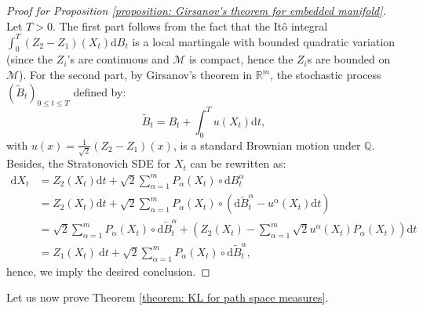\documentclass[10pt,a4paper]{article}
\newcommand{\R}{{\mathbb R}}
\begin{document}
	\begin{proof}[Proof for Proposition \ref{proposition: Girsanov's theorem for embedded manifold}]
Let $T>0$.	The first part follows from the fact that the Itô integral \(\int_0^T (Z_2-Z_1)(X_t) \mathrm{d}B_t\) is a local martingale with bounded quadratic variation (since the \(Z_i\)'s are continuous and \(\mathcal{M}\) is compact, hence the \(Z_i\)s are bounded on \(\mathcal{M}\)).
	For the second part, by Girsanov's theorem in $\R^m$, the stochastic process \((\widetilde{B}_t)_{ 0\le t \le T}\) defined by:
	\[ \widetilde{B}_t = B_t + \int_0^T u(X_t) \mathrm{d}t, \]
	with $u(x)= \frac{1}{\sqrt{2}} (Z_2-Z_1)(x)$, is a standard Brownian motion under \(\mathbb{Q}\).
	Besides, the Stratonovich SDE for \(X_t\) can be rewritten as:
	\begin{align*}
	\mathrm{d} X_t & = Z_2(X_t)\mathrm{d}t + \sqrt{2}\sum_{\alpha=1}^m P_\alpha(X_t) \circ \mathrm{d}B^\alpha_t \\
	& = Z_2(X_t)\mathrm{d}t + \sqrt{2}\sum_{\alpha=1}^m P_\alpha(X_t) \circ \left(\mathrm{d}\widetilde{B}^\alpha_t - u^\alpha(X_t)\mathrm{d}t \right) \\
	& = \sqrt{2}\sum_{\alpha=1}^m P_\alpha(X_t) \circ \mathrm{d}\widetilde{B}^\alpha_t+(Z_2(X_t)-\sum_{\alpha=1}^m \sqrt{2}u^\alpha (X_t) P_\alpha (X_t)) \mathrm{d} t \\
	& = Z_1(X_t)\ \mathrm{d}t + \sqrt{2}\sum_{\alpha=1}^m P_\alpha (X_t) \circ \mathrm{d}\widetilde{B}^\alpha_t,
	\end{align*}
	hence, we imply the desired conclusion.
		\end{proof}
	
	Let us now prove Theorem \ref{theorem: KL for path space measures}.
\end{document}
